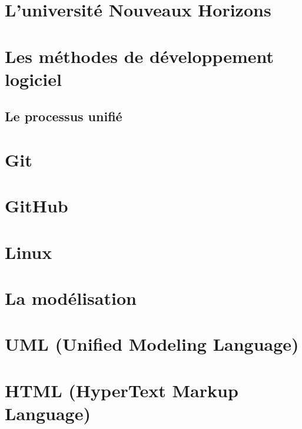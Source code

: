 \documentclass[12pt, a4paper]{report}
\begin{document}
    \section{L'université Nouveaux Horizons}\label{subsec:unh}
    

    \section{Les méthodes de développement logiciel}\label{subsec:methode-de-developpement-logiciel}
    

    \subsection{Le processus unifié}\label{subsec:processus-unifie}
    

    \section{Git}\label{sec:git-1}
    

    \section{GitHub}\label{sec:github-1}
    

    \section{Linux}\label{sec:linux}
    
   
    \section{La modélisation}\label{sec:modelisation}
    

    \section{UML (Unified Modeling Language)}\label{sec:uml}
    

    \section{HTML (HyperText Markup Language)}\label{sec:html}
    
\end{document}
